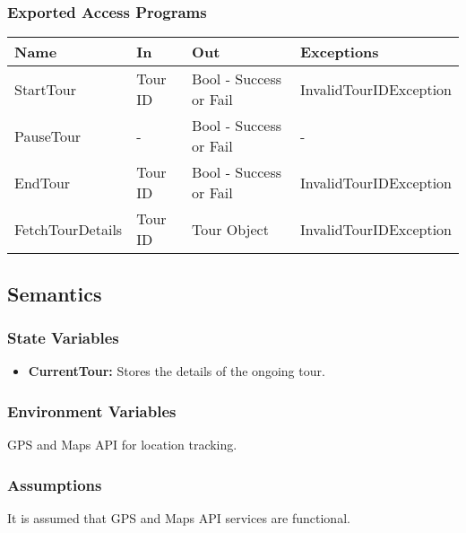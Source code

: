 \documentclass[12pt, titlepage]{article}
\begin{document}
\subsubsection{Exported Access Programs}

\begin{center}
  \begin{tabular}{p{4cm} p{2cm} p{4cm} p{4cm}}
    \hline
    \textbf{Name}    & \textbf{In} & \textbf{Out}           & \textbf{Exceptions}    \\
    \hline
    StartTour        & Tour ID     & Bool - Success or Fail & InvalidTourIDException \\
    \hline
    PauseTour        & -           & Bool - Success or Fail & -                      \\
    \hline
    EndTour          & Tour ID     & Bool - Success or Fail & InvalidTourIDException \\
    \hline
    FetchTourDetails & Tour ID     & Tour Object            & InvalidTourIDException \\
    \hline
  \end{tabular}
\end{center}

\subsection{Semantics}

\subsubsection{State Variables}

\begin{itemize}
  \item \textbf{CurrentTour:} Stores the details of the ongoing tour.
\end{itemize}

\subsubsection{Environment Variables}

GPS and Maps API for location tracking.

\subsubsection{Assumptions}

It is assumed that GPS and Maps API services are functional.
\end{document}
